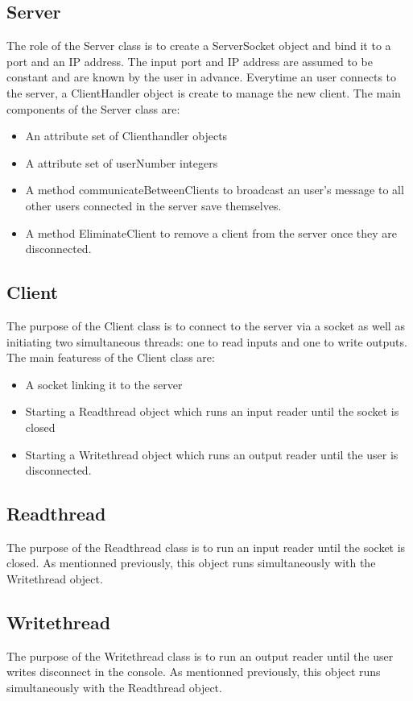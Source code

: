 \documentclass[11pt,letterpaper]{article}
\begin{document}
\subsection{Server}
The role of the Server class is to create a ServerSocket object and bind it to a port and an IP address. The input port and IP address are assumed to be constant and are known by the user in advance. Everytime an user connects to the server, a ClientHandler object is create to manage the new client. The main components of the Server class are:

\begin{itemize}
  \item An attribute set of Clienthandler objects
  \item A attribute set of userNumber integers
\item A method communicateBetweenClients to broadcast an user's message to all other users connected in the server save themselves.
\item A method EliminateClient to remove a client from the server once they are disconnected.
\end{itemize}

\subsection{Client}
The purpose of the Client class is to connect to the server via a socket as well as initiating two simultaneous threads: one to read inputs and one to write outputs. The main featuress of the Client class are:
\begin{itemize}
  \item A socket linking it to the server
  \item Starting a Readthread object which runs an input reader until the socket is closed
  \item Starting a Writethread object which runs an output reader until the user is disconnected.
\end{itemize}

\subsection{Readthread}
The purpose of the Readthread class is to run an input reader until the socket is closed. As mentionned previously, this object runs simultaneously with the Writethread object.

\subsection{Writethread}
The purpose of the Writethread class is to run an output reader until the user writes disconnect in the console. As mentionned previously, this object runs simultaneously with the Readthread object.
\end{document}
